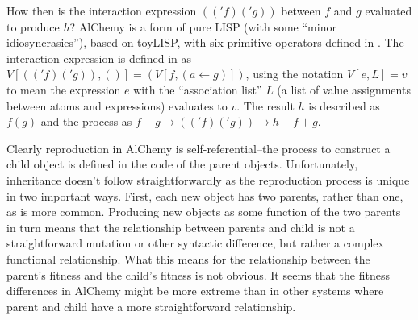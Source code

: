 How then is the interaction expression $(('f)('g))$ between $f$ and $g$ evaluated to produce $h$? AlChemy is a form of pure LISP (with some ``minor idiosyncrasies''), based on toyLISP, with six primitive operators defined in \textcite[p.205]{Fontana1992}. The interaction expression is defined in \textcite[Definition A.9, p.204]{Fontana1992} as $V[(('f)('g)),()] = (V[f,(a\leftarrow g)])$, using the notation $V[e,L]=v$ to mean the expression $e$ with the ``association list'' $L$ (a list of value assignments between atoms and expressions) evaluates to $v$. The result $h$ is described as $f(g)$ and the process as $f+g \rightarrow (('f)('g)) \rightarrow h + f + g$.

Clearly reproduction in AlChemy is self-referential--the process to construct a child object is defined in the code of the parent objects. Unfortunately, inheritance doesn't follow straightforwardly as the reproduction process is unique in two important ways. First, each new object has two parents, rather than one, as is more common. Producing new objects as some function of the two parents in turn means that the relationship between parents and child is not a straightforward mutation or other syntactic difference, but rather a complex functional relationship. What this means for the relationship between the parent's fitness and the child's fitness is not obvious. It seems that the fitness differences in AlChemy might be more extreme than in other systems where parent and child have a more straightforward relationship.

